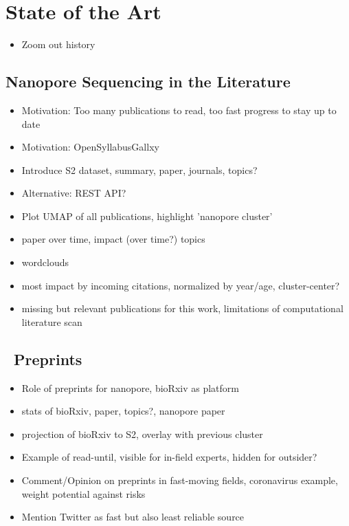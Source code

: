 \chapter{State of the Art}
\label{sec:state_of_art}

\begin{itemize}
    \item Zoom out history \cite{Deamer2016}
\end{itemize}

\section{Nanopore Sequencing in the Literature}

\begin{itemize}
    \item Motivation: Too many publications to read, too fast progress to stay up to date
    \item Motivation: OpenSyllabusGallxy
    \item Introduce S2 dataset, summary, paper, journals, topics?
    \item Alternative: REST API?
    \item Plot UMAP of all publications, highlight 'nanopore cluster'
    \item paper over time, impact (over time?) topics
    \item wordclouds
    \item most impact by incoming citations, normalized by year/age, cluster-center?
    \item missing but relevant publications for this work, limitations of computational literature scan
\end{itemize}

\section{\Biorxiv\ Preprints}

\begin{itemize}
    \item Role of preprints for nanopore, bioRxiv as platform
    \item stats of bioRxiv, paper, topics?, nanopore paper
    \item projection of bioRxiv to S2, overlay with previous cluster
    \item Example of read-until, visible for in-field experts, hidden for outsider?
    \item Comment/Opinion on preprints in fast-moving fields, coronavirus example, weight potential against risks
    \item Mention Twitter as fast but also least reliable source
\end{itemize}

